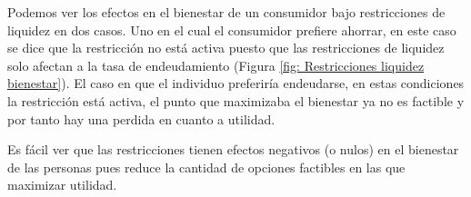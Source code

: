 Podemos ver los efectos en el bienestar de un consumidor bajo restricciones de liquidez en dos casos. Uno en el cual el consumidor prefiere ahorrar, en este caso se dice que la restricción no está activa puesto que las restricciones de liquidez solo afectan a la tasa de endeudamiento (Figura \ref{fig: Restricciones liquidez bienestar}). El caso en que el individuo preferiría endeudarse, en estas condiciones la restricción está activa, el punto que maximizaba el bienestar ya no es factible y por tanto hay una perdida en cuanto a utilidad. 

Es fácil ver que las restricciones tienen efectos negativos (o nulos) en el bienestar de las personas pues reduce la cantidad de opciones factibles en las que maximizar utilidad. 